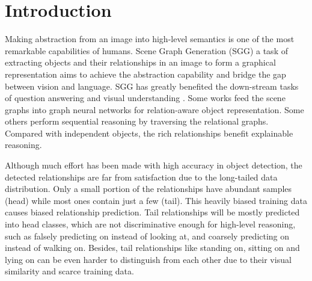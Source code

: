 \documentclass{article}
\begin{document}
\section{Introduction}
\label{sec:intro}
Making abstraction from an image into high-level semantics is one of the most remarkable capabilities of humans. Scene Graph Generation (SGG) \cite{xu2017scene}  a task of extracting objects and their  relationships in an image to form a graphical representation  aims to achieve the abstraction capability and bridge the gap between vision and language. SGG has greatly benefited the down-stream tasks of question answering \cite{norcliffe2018learning,Zhu2020Mucko} and visual understanding \cite{shi2019explainable,Jiang2020DualVD}. Some works \cite{Zhu2020Mucko,Jiang2020DualVD} feed the scene graphs into graph neural networks for relation-aware object representation. Some others \cite{hudson2019learning} perform sequential reasoning by traversing the relational graphs. Compared with independent objects, the rich relationships benefit  explainable reasoning. 




Although much effort has been made  with high accuracy in object detection, the detected relationships are far from satisfaction due to the long-tailed data distribution. Only a small portion of the relationships have abundant samples (head) while most ones contain just a few (tail). This heavily biased training data causes biased relationship prediction. Tail relationships will be mostly predicted into head classes, which are not  discriminative  enough for high-level reasoning, such as falsely predicting {\ttfamily on} instead of {\ttfamily looking at}, and coarsely predicting {\ttfamily on} instead of {\ttfamily walking on}.  Besides, tail relationships like {\ttfamily standing on}, {\ttfamily sitting on} and {\ttfamily lying on} can be even harder to distinguish from each other due to their visual similarity and scarce training data.
\end{document}
